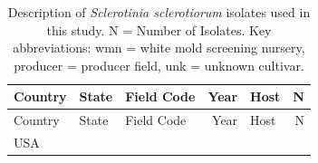 \documentclass[fleqn,10pt,lineno]{wlpeerj} %
\theoremstyle{definition}
\theoremstyle{definition}
\theoremstyle{definition}
\theoremstyle{remark}
\begin{document}
\begin{longtable}[]{@{}lllrlr@{}}
\caption{\label{tab:isolate-table} Description of \emph{Sclerotinia
sclerotiorum} isolates used in this study. N = Number of Isolates. Key
abbreviations: wmn = white mold screening nursery, producer = producer
field, unk = unknown cultivar.}\tabularnewline
\toprule
\begin{minipage}[b]{0.11\columnwidth}\raggedright\strut
Country\strut
\end{minipage} & \begin{minipage}[b]{0.08\columnwidth}\raggedright\strut
State\strut
\end{minipage} & \begin{minipage}[b]{0.12\columnwidth}\raggedright\strut
Field Code\strut
\end{minipage} & \begin{minipage}[b]{0.19\columnwidth}\raggedleft\strut
Year\strut
\end{minipage} & \begin{minipage}[b]{0.29\columnwidth}\raggedright\strut
Host\strut
\end{minipage} & \begin{minipage}[b]{0.04\columnwidth}\raggedleft\strut
N\strut
\end{minipage}\tabularnewline
\midrule
\endfirsthead
\toprule
\begin{minipage}[b]{0.11\columnwidth}\raggedright\strut
Country\strut
\end{minipage} & \begin{minipage}[b]{0.08\columnwidth}\raggedright\strut
State\strut
\end{minipage} & \begin{minipage}[b]{0.12\columnwidth}\raggedright\strut
Field Code\strut
\end{minipage} & \begin{minipage}[b]{0.19\columnwidth}\raggedleft\strut
Year\strut
\end{minipage} & \begin{minipage}[b]{0.29\columnwidth}\raggedright\strut
Host\strut
\end{minipage} & \begin{minipage}[b]{0.04\columnwidth}\raggedleft\strut
N\strut
\end{minipage}\tabularnewline
\midrule
\endhead
\begin{minipage}[t]{0.11\columnwidth}\raggedright\strut
USA\strut
\end{minipage} & \begin{minipage}[t]{0.08\columnwidth}\raggedright\strut

\end{minipage}
\end{longtable}
\end{document}
